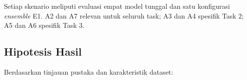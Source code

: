 \begin{table}[h]
    \centering
    \caption{Skenario \textit{ablation study} komponen-per-komponen}
    \label{table:skenario_ablation}
    \begin{flushleft}
        \footnotesize{Setiap skenario meliputi evaluasi empat model
        tunggal dan satu konfigurasi \textit{ensemble} E1. A2 dan A7
        relevan untuk seluruh task; A3 dan A4 spesifik Task 2; A5 dan
        A6 spesifik Task 3.}
    \end{flushleft}
\end{table}

\subsection{Hipotesis Hasil}
Berdasarkan tinjauan pustaka dan karakteristik dataset:


